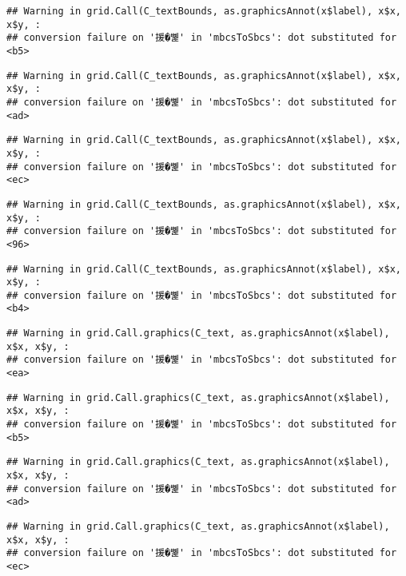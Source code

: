\documentclass[
]{article}
\begin{document}
\begin{verbatim}
## Warning in grid.Call(C_textBounds, as.graphicsAnnot(x$label), x$x, x$y, :
## conversion failure on '援�뼱' in 'mbcsToSbcs': dot substituted for <b5>
\end{verbatim}

\begin{verbatim}
## Warning in grid.Call(C_textBounds, as.graphicsAnnot(x$label), x$x, x$y, :
## conversion failure on '援�뼱' in 'mbcsToSbcs': dot substituted for <ad>
\end{verbatim}

\begin{verbatim}
## Warning in grid.Call(C_textBounds, as.graphicsAnnot(x$label), x$x, x$y, :
## conversion failure on '援�뼱' in 'mbcsToSbcs': dot substituted for <ec>
\end{verbatim}

\begin{verbatim}
## Warning in grid.Call(C_textBounds, as.graphicsAnnot(x$label), x$x, x$y, :
## conversion failure on '援�뼱' in 'mbcsToSbcs': dot substituted for <96>
\end{verbatim}

\begin{verbatim}
## Warning in grid.Call(C_textBounds, as.graphicsAnnot(x$label), x$x, x$y, :
## conversion failure on '援�뼱' in 'mbcsToSbcs': dot substituted for <b4>
\end{verbatim}

\begin{verbatim}
## Warning in grid.Call.graphics(C_text, as.graphicsAnnot(x$label), x$x, x$y, :
## conversion failure on '援�뼱' in 'mbcsToSbcs': dot substituted for <ea>
\end{verbatim}

\begin{verbatim}
## Warning in grid.Call.graphics(C_text, as.graphicsAnnot(x$label), x$x, x$y, :
## conversion failure on '援�뼱' in 'mbcsToSbcs': dot substituted for <b5>
\end{verbatim}

\begin{verbatim}
## Warning in grid.Call.graphics(C_text, as.graphicsAnnot(x$label), x$x, x$y, :
## conversion failure on '援�뼱' in 'mbcsToSbcs': dot substituted for <ad>
\end{verbatim}

\begin{verbatim}
## Warning in grid.Call.graphics(C_text, as.graphicsAnnot(x$label), x$x, x$y, :
## conversion failure on '援�뼱' in 'mbcsToSbcs': dot substituted for <ec>
\end{verbatim}
\end{document}
